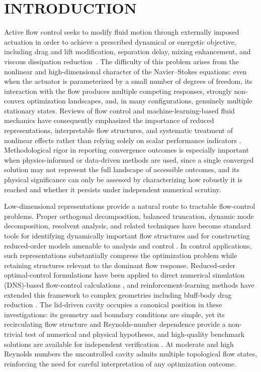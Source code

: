 \documentclass[a4paper,11pt]{article}
\begin{document}
\section{INTRODUCTION}
\label{sec:intro}

Active flow control seeks to modify fluid motion through externally imposed
actuation in order to achieve a prescribed dynamical or energetic objective,
including drag and lift modification, separation delay, mixing enhancement, and
viscous dissipation reduction~\cite{gad2000flow,brunton2015closed}. The difficulty
of this problem arises from the nonlinear and high-dimensional character of the
Navier--Stokes equations: even when the actuator is parameterized by a small number
of degrees of freedom, its interaction with the flow produces multiple competing
responses, strongly non-convex optimization landscapes, and, in many configurations,
genuinely multiple stationary states. Reviews of flow control and machine-learning-based
fluid mechanics have consequently emphasized the importance of reduced representations,
interpretable flow structures, and systematic treatment of nonlinear effects rather
than relying solely on scalar performance indicators
\cite{brunton2015closed,gad2000flow,duraisamy2019turbulence,brenner2019perspective}.
Methodological rigor in reporting convergence outcomes is especially important
when physics-informed or data-driven methods are used, since a single converged
solution may not represent the full landscape of accessible outcomes, and its
physical significance can only be assessed by characterizing how robustly it is
reached and whether it persists under independent numerical scrutiny.

Low-dimensional representations provide a natural route to tractable flow-control
problems. Proper orthogonal decomposition, balanced truncation, dynamic mode
decomposition, resolvent analysis, and related techniques have become standard
tools for identifying dynamically important flow structures and for constructing
reduced-order models amenable to analysis and control
\cite{rowley2017model,taira2017modal,schmid2010dmd,noack2003hierarchy}. In control
applications, such representations substantially compress the optimization problem
while retaining structures relevant to the dominant flow response. Reduced-order
optimal-control formulations have been applied to direct numerical simulation (DNS)-based flow-control calculations
\cite{bergmann2005optimal,bewley2001dns}, and reinforcement-learning methods have
extended this framework to complex geometries including bluff-body drag reduction
\cite{rabault2019drl,garnier2021drl}. The lid-driven cavity occupies a canonical
position in these investigations: its geometry and boundary conditions are simple,
yet its recirculating flow structure and Reynolds-number dependence provide a
non-trivial test of numerical and physical hypotheses, and high-quality benchmark
solutions are available for independent verification \cite{ghia1982high}. At
moderate and high Reynolds numbers the uncontrolled cavity admits multiple
topological flow states, reinforcing the need for careful interpretation of any
optimization outcome.
\end{document}
